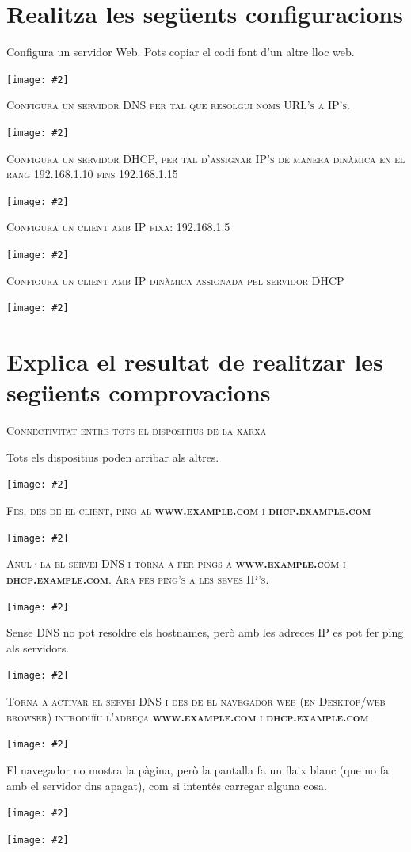 \documentclass[a4paper,12pt]{article}
\newcommand{\mygraphic}[2][height=0.4\textheight]{\begin{center}
		\centering\texttt{[image: \#2]}\par
\end{center}}
\begin{document}


\tableofcontents
\newpage

\section{Realitza les següents configuracions}
Configura un servidor Web. Pots copiar el codi font d’un altre lloc web.
\mygraphic{imatges/01.png}

\textsc{Configura un servidor DNS per tal que resolgui noms URL’s a IP’s.}
\mygraphic{imatges/02.png}

\newpage
\textsc{Configura un servidor DHCP, per tal d’assignar IP’s de manera dinàmica en el rang 192.168.1.10 fins 192.168.1.15}
\mygraphic{imatges/03.png}

\textsc{Configura un client amb IP fixa: 192.168.1.5}
\mygraphic{imatges/04.png}

\newpage
\textsc{Configura un client amb IP dinàmica assignada pel servidor DHCP}
\mygraphic{imatges/05.png}

\newpage
\section{Explica el resultat de realitzar les següents comprovacions}
\textsc{Connectivitat entre tots el dispositius de la xarxa}

Tots els dispositius poden arribar als altres.
\mygraphic[width=\textwidth]{imatges/06.png}

\textsc{Fes, des de el client, ping al \textbf{www.example.com} i \textbf{dhcp.example.com}}
\mygraphic{imatges/07.png}

\newpage
\textsc{Anul·la el servei DNS i torna a fer pings a \textbf{www.example.com} i \textbf{dhcp.example.com}. Ara fes  ping’s a les seves IP’s.}
\mygraphic{imatges/08.png}
Sense DNS no pot resoldre els hostnames, però amb les adreces IP es pot fer ping als servidors.
\mygraphic{imatges/09.png}

\newpage
\textsc{Torna a activar el servei DNS i des de el navegador web (en Desktop/web browser) introduïu l’adreça \textbf{www.example.com} i \textbf{dhcp.example.com}}
\mygraphic{imatges/10.png}

El navegador no mostra la pàgina, però la pantalla fa un flaix blanc (que no fa amb el servidor dns apagat), com si intentés carregar alguna cosa.
\mygraphic{imatges/11.png}
\mygraphic{imatges/12.png}
\end{document}
